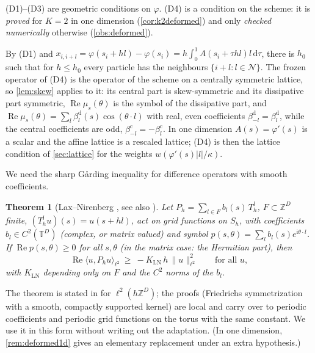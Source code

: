 \documentclass[11pt,a4paper]{article}
\theoremstyle{plain}
\newtheorem{theorem}{Theorem}[section]
\theoremstyle{definition}
\theoremstyle{remark}
\numberwithin{equation}{section}
\newcommand{\Z}{\mathbb{Z}}
\newcommand{\T}{\mathbb{T}}
\newcommand{\dd}{\mathrm{d}}
\renewcommand{\Re}{\operatorname{Re}}
\newcommand{\ii}{\mathrm{i}}
\begin{document}
(D1)--(D3) are geometric conditions on $\varphi$. (D4) is a condition on the scheme: it is \emph{proved} for $K=2$ in one dimension (\cref{cor:k2deformed}) and only \emph{checked numerically} otherwise (\cref{obs:deformed}).

By (D1) and $x_{i,i+l}=\varphi(s_i+hl)-\varphi(s_i)=h\int_0^1A(s_i+\tau hl)l\,\dd\tau$, there is $h_0$ such that for $h\le h_0$ every particle has the neighbours $\{i+l:l\in\mathcal N\}$. The frozen operator of (D4) is the operator of the scheme on a centrally symmetric lattice, so \cref{lem:skew} applies to it: its central part is skew-symmetric and its dissipative part symmetric, $\Re\mu_s(\theta)$ is the symbol of the dissipative part, and $\Re\mu_s(\theta)=\sum_{l}\beta^{\mathrm d}_l(s)\cos(\theta\cdot l)$ with real, even coefficients $\beta^{\mathrm d}_{-l}=\beta^{\mathrm d}_l$, while the central coefficients are odd, $\beta^{\mathrm c}_{-l}=-\beta^{\mathrm c}_l$. In one dimension $A(s)=\varphi'(s)$ is a scalar and the affine lattice is a rescaled lattice; (D4) is then the lattice condition of \cref{sec:lattice} for the weights $w(\varphi'(s)|l|/\kappa)$.

We need the sharp G{\aa}rding inequality for difference operators with smooth coefficients.

\begin{theorem}[Lax--Nirenberg \cite{LaxNirenberg1966}, see also \cite{Vaillancourt1970}]\label{thm:LN}
Let $P_h=\sum_{l\in F}b_l(s)\,T_h^l$, $F\subset\Z^D$ finite, $(T^l_hu)(s)=u(s+hl)$, act on grid functions on $S_h$, with coefficients $b_l\in C^2(\T^D)$ (complex, or matrix valued) and symbol $p(s,\theta)=\sum_lb_l(s)e^{\ii\theta\cdot l}$. If $\Re p(s,\theta)\ge0$ for all $s,\theta$ (in the matrix case: the Hermitian part), then
\begin{equation}
\Re\langle u,P_hu\rangle_{\ell^2}\ \ge\ -K_{\mathrm{LN}}\,h\,\|u\|^2_{\ell^2}\qquad\text{for all }u,
\end{equation}
with $K_{\mathrm{LN}}$ depending only on $F$ and the $C^2$ norms of the $b_l$.
\end{theorem}

\noindent The theorem is stated in \cite{LaxNirenberg1966,Vaillancourt1970} for $\ell^2(h\Z^D)$; the proofs (Friedrichs symmetrization with a smooth, compactly supported kernel) are local and carry over to periodic coefficients and periodic grid functions on the torus with the same constant. We use it in this form without writing out the adaptation. (In one dimension, \cref{rem:deformed1d} gives an elementary replacement under an extra hypothesis.)
\end{document}
